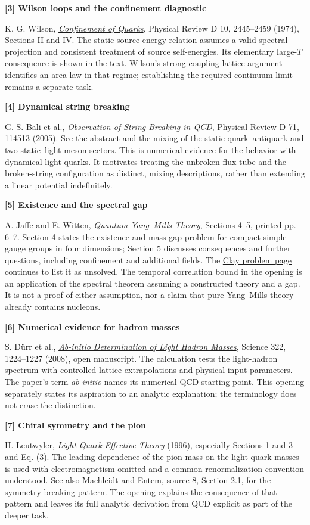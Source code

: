 \documentclass[11pt]{article}
\newcommand{\source}[3]{\par\medskip\hypertarget{src#1}{}\textbf{[#1] #2}\par\nopagebreak #3\par}
\begin{document}
\source{3}{Wilson loops and the confinement diagnostic}{K. G. Wilson, \href{https://hep.physics.uoc.gr/Erasmus-IP-2013/files/lectures/Rabinovici/Wilson.pdf}{\emph{Confinement of Quarks}}, Physical Review D 10, 2445--2459 (1974), Sections II and IV. The static-source energy relation assumes a valid spectral projection and consistent treatment of source self-energies. Its elementary large-$T$ consequence is shown in the text. Wilson's strong-coupling lattice argument identifies an area law in that regime; establishing the required continuum limit remains a separate task.}

\source{4}{Dynamical string breaking}{G. S. Bali et al., \href{https://arxiv.org/abs/hep-lat/0505012}{\emph{Observation of String Breaking in QCD}}, Physical Review D 71, 114513 (2005). See the abstract and the mixing of the static quark--antiquark and two static--light-meson sectors. This is numerical evidence for the behavior with dynamical light quarks. It motivates treating the unbroken flux tube and the broken-string configuration as distinct, mixing descriptions, rather than extending a linear potential indefinitely.}

\source{5}{Existence and the spectral gap}{A. Jaffe and E. Witten, \href{https://www.claymath.org/wp-content/uploads/2022/06/yangmills.pdf}{\emph{Quantum Yang--Mills Theory}}, Sections 4--5, printed pp. 6--7. Section 4 states the existence and mass-gap problem for compact simple gauge groups in four dimensions; Section 5 discusses consequences and further questions, including confinement and additional fields. The \href{https://www.claymath.org/millennium/yang-mills-the-maths-gap/}{Clay problem page} continues to list it as unsolved. The temporal correlation bound in the opening is an application of the spectral theorem assuming a constructed theory and a gap. It is not a proof of either assumption, nor a claim that pure Yang--Mills theory already contains nucleons.}

\source{6}{Numerical evidence for hadron masses}{S. D\"urr et al., \href{https://arxiv.org/abs/0906.3599}{\emph{Ab-initio Determination of Light Hadron Masses}}, Science 322, 1224--1227 (2008), open manuscript. The calculation tests the light-hadron spectrum with controlled lattice extrapolations and physical input parameters. The paper's term \emph{ab initio} names its numerical QCD starting point. This opening separately states its aspiration to an analytic explanation; the terminology does not erase the distinction.}

\source{7}{Chiral symmetry and the pion}{H. Leutwyler, \href{https://arxiv.org/abs/hep-ph/9609465}{\emph{Light Quark Effective Theory}} (1996), especially Sections 1 and 3 and Eq. (3). The leading dependence of the pion mass on the light-quark masses is used with electromagnetism omitted and a common renormalization convention understood. See also Machleidt and Entem, source 8, Section 2.1, for the symmetry-breaking pattern. The opening explains the consequence of that pattern and leaves its full analytic derivation from QCD explicit as part of the deeper task.}
\end{document}
